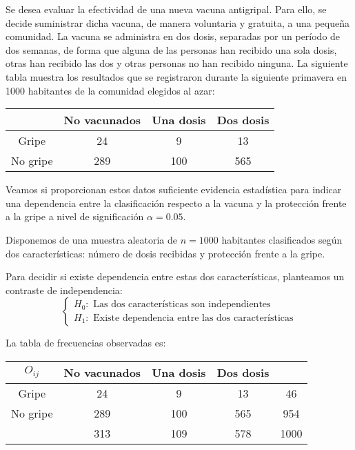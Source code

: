 \begin{example}
    Se desea evaluar la efectividad de una nueva vacuna antigripal. Para ello, se decide suministrar dicha vacuna, de manera voluntaria y gratuita, a una pequeña comunidad.
    La vacuna se administra en dos dosis, separadas por un período de dos semanas, de forma que alguna de las personas han recibido una sola dosis, otras han recibido las dos y otras personas no han recibido ninguna.
    La siguiente tabla muestra los resultados que se registraron durante la siguiente primavera en 1000 habitantes de la comunidad elegidos al azar:
    \begin{center}
        \begin{tabular}{| c | c c c |}
            \hline
                     & No vacunados & Una dosis & Dos dosis \\
            \hline
            Gripe    & 24           & 9         & 13        \\
            No gripe & 289          & 100       & 565       \\
            \hline
        \end{tabular}
    \end{center}
    Veamos si proporcionan estos datos suficiente evidencia estadística para indicar una dependencia entre la clasificación respecto a la vacuna y la protección frente a la gripe a nivel de significación $\alpha = 0.05$.

    Disponemos de una muestra aleatoria de $n = 1000$ habitantes clasificados según dos características: número de dosis recibidas y protección frente a la gripe.

    Para decidir si existe dependencia entre estas dos características, planteamos un contraste de independencia:
    $$\begin{cases}
            H_0: \text{ Las dos características son independientes} \\
            H_1: \text{ Existe dependencia entre las dos características}
        \end{cases}$$

    La tabla de frecuencias observadas es:
    \begin{center}
        \begin{tabular}{| c | c c c | c |}
            \hline
            $O_{ij}$ & No vacunados & Una dosis & Dos dosis &      \\
            \hline
            Gripe    & 24           & 9         & 13        & 46   \\
            No gripe & 289          & 100       & 565       & 954  \\
            \hline
                     & 313          & 109       & 578       & 1000 \\
            \hline
        \end{tabular}
    \end{center}


\end{example}

